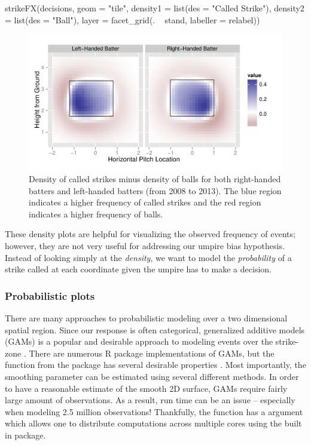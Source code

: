 \documentclass[a4paper]{report}\usepackage[]{graphicx}\usepackage[]{color}
\begin{document}
\begin{article}
\begin{Schunk}
\begin{Sinput}
strikeFX(decisions, geom = "tile", density1 = list(des = "Called Strike"), 
  density2 = list(des = "Ball"), layer = facet_grid(. ~ stand, labeller = relabel)) 
\end{Sinput}
\end{Schunk}


\begin{figure}[h]
\centerline{\includegraphics[scale = 1]{strikesVSballs.pdf}}

\caption{\label{fig:strikesVSballs} Density of called strikes minus density
of balls for both right-handed batters and left-handed batters (from
2008 to 2013). The blue region indicates a higher frequency of called
strikes and the red region indicates a higher frequency of balls.}
\end{figure}


These density plots are helpful for visualizing the observed frequency
of events; however, they are not very useful for addressing our umpire
bias hypothesis. Instead of looking simply at the \emph{density},
we want to model the \emph{probability} of a strike called at each
coordinate given the umpire has to make a decision. 


\subsubsection{Probabilistic plots}

There are many approaches to probabilistic modeling over a two dimensional
spatial region. Since our response is often categorical, generalized
additive models (GAMs) is a popular and desirable approach to modeling
events over the strike-zone \citep{loess}. There are numerous R package
implementations of GAMs, but the  function from the 
package has several desirable properties \citep{mgcv}. Most importantly,
the smoothing parameter can be estimated using several different methods.
In order to have a reasonable estimate of the smooth 2D surface, GAMs
require fairly large amount of observations. As a result, run time
can be an issue -- especially when modeling 2.5 million observations!
Thankfully, the  function has a  argument
which allows one to distribute computations across multiple cores
using the built in  package.


\end{article}
\end{document}
